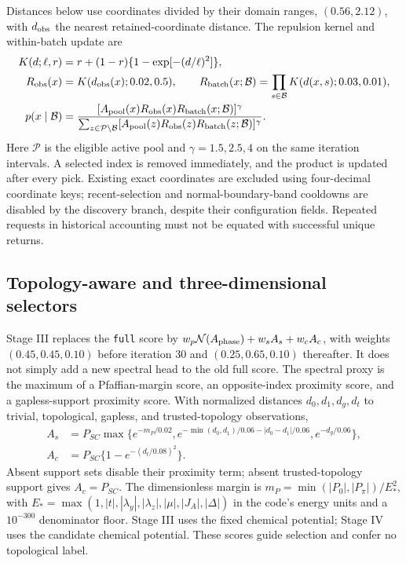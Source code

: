 Distances below use coordinates divided by their domain ranges, $(0.56,2.12)$, with $d_{\rm obs}$ the nearest retained-coordinate distance. The repulsion kernel and within-batch update are
\begin{align}
K(d;\ell,r)&=r+(1-r)\{1-\exp[-(d/\ell)^2]\},\label{eq:kernel}\\
R_{\rm obs}(x)&=K(d_{\rm obs}(x);0.02,0.5),\qquad
R_{\rm batch}(x;\mathcal B)=\prod_{s\in\mathcal B}K(d(x,s);0.03,0.01),\label{eq:repulsion}\\
p(x\mid\mathcal B)&=\frac{[A_{\rm pool}(x)R_{\rm obs}(x)R_{\rm batch}(x;\mathcal B)]^\gamma}
{\sum_{z\in\mathcal P\setminus\mathcal B}[A_{\rm pool}(z)R_{\rm obs}(z)R_{\rm batch}(z;\mathcal B)]^\gamma}.\label{eq:batchprob}
\end{align}
Here $\mathcal P$ is the eligible active pool and $\gamma=1.5,2.5,4$ on the same iteration intervals. A selected index is removed immediately, and the product is updated after every pick. Existing exact coordinates are excluded using four-decimal coordinate keys; recent-selection and normal-boundary-band cooldowns are disabled by the discovery branch, despite their configuration fields. Repeated requests in historical accounting must not be equated with successful unique returns.

\subsection{Topology-aware and three-dimensional selectors}\label{sec:stage-selectors}
Stage III replaces the \texttt{full} score by $w_p\mathcal N(A_{\rm phase})+w_sA_s+w_cA_c$, with weights $(0.45,0.45,0.10)$ before iteration 30 and $(0.25,0.65,0.10)$ thereafter. It does not simply add a new spectral head to the old full score. The spectral proxy is the maximum of a Pfaffian-margin score, an opposite-index proximity score, and a gapless-support proximity score. With normalized distances $d_0,d_1,d_g,d_t$ to trivial, topological, gapless, and trusted-topology observations,
\begin{align}
A_s&=P_{SC}\max\{e^{-m_P/0.02},e^{-\min(d_0,d_1)/0.06-|d_0-d_1|/0.06},e^{-d_g/0.06}\},\label{eq:toposcore}\\
A_c&=P_{SC}\{1-e^{-(d_t/0.08)^2}\}.\label{eq:topocoverage}
\end{align}
Absent support sets disable their proximity term; absent trusted-topology support gives $A_c=P_{SC}$. The dimensionless margin is $m_P=\min(|P_0|,|P_\pi|)/E_*^2$, with $E_*=\max(1,|t|,|\lambda_y|,|\lambda_z|,|\mu|,|J_A|,|\Delta|)$ in the code's energy units and a $10^{-300}$ denominator floor. Stage III uses the fixed chemical potential; Stage IV uses the candidate chemical potential. These scores guide selection and confer no topological label.

